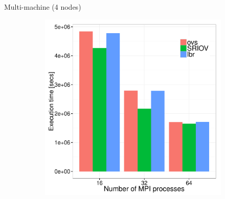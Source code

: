 \documentclass[11pt,xcolor=dvipsnames,presentation]{beamer}
\begin{document}
\begin{frame}[label=sec-3-0-12]{Multi-machine (4 nodes)}
\begin{figure}
\begin{subfigure}[b]{0.42\textwidth}
    \includegraphics[scale=0.25,angle=0]{figures/inter-container-epB.pdf}
  \end{subfigure}
\end{figure}
\end{frame}
\end{document}
